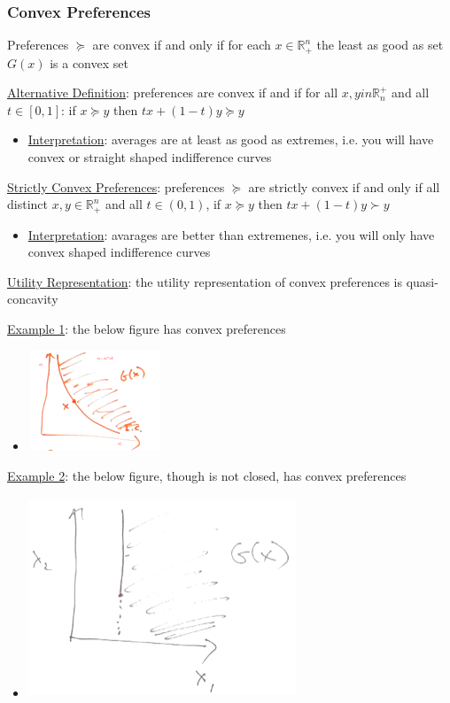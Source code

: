 \documentclass{article}
\begin{document}
\subsubsection{Convex Preferences}
Preferences $\succeq$ are convex if and only if for each $x \in \mathbb{R}_{+}^{n}$ the least as good as set $G(x)$ is a convex set \par \vspace{0.3em}
  \underline{Alternative Definition}: preferences are convex if and if for all $x, yin \mathbb{R}_{n}^{+}$ and all $t \in [0,1]$: if $x \succeq y$ then $tx + (1-t)y \succeq y$
  \begin{itemize}
    \item  \underline{Interpretation}: averages are at least as good as extremes, i.e. you will have convex or straight shaped indifference curves
  \end{itemize}
  \par
  \underline{Strictly Convex Preferences}: preferences $\succeq$ are strictly convex if and only if all distinct $x,y \in \mathbb{R}_{+}^{n}$ and all $t \in (0,1)$, if $x \succeq y$ then $tx + (1-t)y \succ y$
  \begin{itemize}
    \item  \underline{Interpretation}: avarages are better than extremenes, i.e. you will only have convex shaped indifference curves
  \end{itemize}
  \par
  \underline{Utility Representation}: the utility representation of convex preferences is quasi-concavity
  \par
  \underline{Example 1}: the below figure has convex preferences
  \begin{itemize}
    \item  \includegraphics[width=4cm, height=3cm]{pic16}
  \end{itemize}
  \par
  \underline{Example 2}: the below figure, though is not closed, has convex preferences
  \begin{itemize}
    \item  \includegraphics[width=8cm, height=6cm]{pic17}
  \end{itemize}
  \par
\vspace{6mm}
\end{document}
